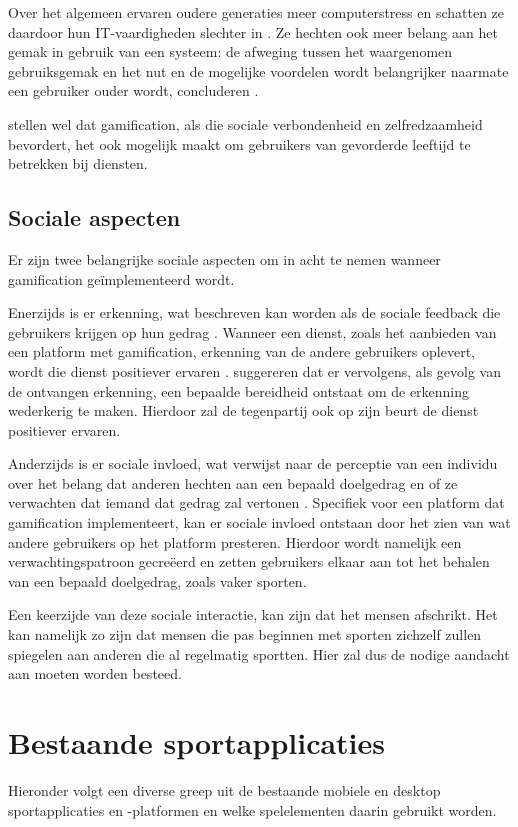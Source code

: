 Over het algemeen ervaren oudere generaties meer computerstress en schatten ze daardoor hun IT-vaardigheden slechter in \autocite{Chung2010}. Ze hechten ook meer belang aan het gemak in gebruik van een systeem: de afweging tussen het waargenomen gebruiksgemak en het nut en de mogelijke voordelen wordt belangrijker naarmate een gebruiker ouder wordt, concluderen \textcite{Melenhorst2001}.

\textcite{Arning2007, Czaja2006} stellen wel dat gamification, als die sociale verbondenheid en zelfredzaamheid bevordert, het ook mogelijk maakt om gebruikers van gevorderde leeftijd te betrekken bij diensten.

\subsection{Sociale aspecten}
Er zijn twee belangrijke sociale aspecten om in acht te nemen wanneer gamification geïmplementeerd wordt.

Enerzijds is er erkenning, wat beschreven kan worden als de sociale feedback die gebruikers krijgen op hun gedrag \autocite{Cheung2011}.
Wanneer een dienst, zoals het aanbieden van een platform met gamification, erkenning van de andere gebruikers oplevert, wordt die dienst positiever ervaren \autocite{Preece2001}.
\textcite{Hamari2013} suggereren dat er vervolgens, als gevolg van de ontvangen erkenning, een bepaalde bereidheid ontstaat om de erkenning wederkerig te maken. Hierdoor zal de tegenpartij ook op zijn beurt de dienst positiever ervaren.

Anderzijds is er sociale invloed, wat verwijst naar de perceptie van een individu over het belang dat anderen hechten aan een bepaald doelgedrag en of ze verwachten dat iemand dat gedrag zal vertonen \autocite{Ajzen1991}. Specifiek voor een platform dat gamification implementeert, kan er sociale invloed ontstaan door het zien van wat andere gebruikers op het platform presteren. Hierdoor wordt namelijk een verwachtingspatroon gecreëerd en zetten gebruikers elkaar aan tot het behalen van een bepaald doelgedrag, zoals vaker sporten.

Een keerzijde van deze sociale interactie, kan zijn dat het mensen afschrikt. Het kan namelijk zo zijn dat mensen die pas beginnen met sporten zichzelf zullen spiegelen aan anderen die al regelmatig sportten. Hier zal dus de nodige aandacht aan moeten worden besteed.

\section{Bestaande sportapplicaties}
Hieronder volgt een diverse greep uit de bestaande mobiele en desktop sportapplicaties en -platformen en welke spelelementen daarin gebruikt worden.

